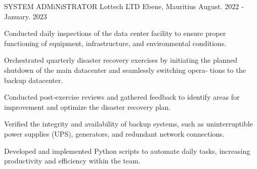 \begin{cventries}
  \cventry
    {SYSTEM ADMiNiSTRATOR} %
    {Lottech LTD} %
    {Ebene, Mauritius} %
    {August. 2022 ‑ January. 2023} %
    {
      \begin{cvitems} %
        \item {Conducted daily inspections of the data center facility to ensure proper functioning of equipment, infrastructure, and environmental conditions.}
        \item {Orchestrated quarterly disaster recovery exercises by initiating the planned shutdown of the main datacenter and seamlessly switching opera‑
        tions to the backup datacenter.}
        \item {Conducted post‑exercise reviews and gathered feedback to identify areas for improvement and optimize the disaster recovery plan.}
        \item {Verified the integrity and availability of backup systems, such as uninterruptible power supplies (UPS), generators, and redundant network
        connections.}
        \item {Developed and implemented Python scripts to automate daily tasks, increasing productivity and efficiency within the team.}
      \end{cvitems}
    }


\end{cventries}
